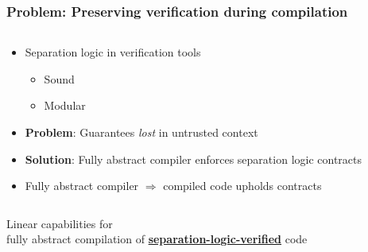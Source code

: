 \documentclass{beamer}
\begin{document}
\begin{frame}
\frametitle{Problem: Preserving verification during compilation}

\begin{columns}
\begin{column}{0.65\textwidth}
\begin{itemize}
\item Separation logic in verification tools
	\begin{itemize}
	\item Sound
	\item Modular
	\end{itemize}
\item \textbf{Problem}: Guarantees \emph{lost} in untrusted context %
\item \textbf{Solution}: Fully abstract compiler enforces separation logic contracts  %
\item Fully abstract compiler $\Rightarrow$ compiled code upholds contracts
\end{itemize}
\end{column}
\begin{column}{0.37\textwidth}
\def\firstcircle{(0,0) circle (2cm)}
\def\secondcircle{(0,0) circle (1.3cm)}

\end{column}
\end{columns}
\end{frame}



\begin{frame}[plain,c]

\begin{center}
\Huge Linear capabilities for\\  fully abstract
compilation of \textbf{\underline{separation-logic-verified}} code
\end{center}
\end{frame}
\end{document}
